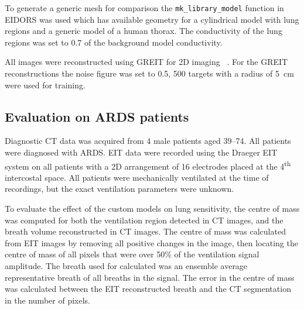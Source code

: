 To generate a generic mesh for comparison the \verb!mk_library_model! function in 
EIDORS was used which has available geometry for a cylindrical model with lung regions
and a generic model of a human thorax. The conductivity of the lung regions was set to 
0.7 of the background model conductivity.

All images were reconstructed using GREIT for 2D
imaging ~\parencite{adler_greit_2009}. For the GREIT 
reconstructions the noise figure was set to 0.5, 
500 targets with a radius of 5 cm were used for training.

\subsection{Evaluation on ARDS patients} \label{sec:gi-scores}

Diagnostic CT data was acquired from 4 male patients aged 39--74. 
All patients were diagnosed with ARDS.
EIT data were recorded using the Draeger EIT system on all patients
with a 2D arrangement of 16 electrodes placed at the 
4\textsuperscript{th} intercostal space. 
All patients were mechanically ventilated
at the time of recordings, but the exact 
ventilation parameters were unknown.

To evaluate the effect of the custom models on lung sensitivity,
the centre of mass was computed for both the ventilation region detected in 
CT images, and the breath volume reconstructed in CT images. 
The centre of mass was calculated from EIT images by removing all 
positive changes in the image, then locating the centre of mass 
of all pixels that were over 50\% of the ventilation signal amplitude. 
The breath used for calculated was an ensemble average representative breath
of all breaths in the signal.
The error in the centre of mass was calculated between the EIT reconstructed breath 
and the CT segmentation in the number of pixels.

%

